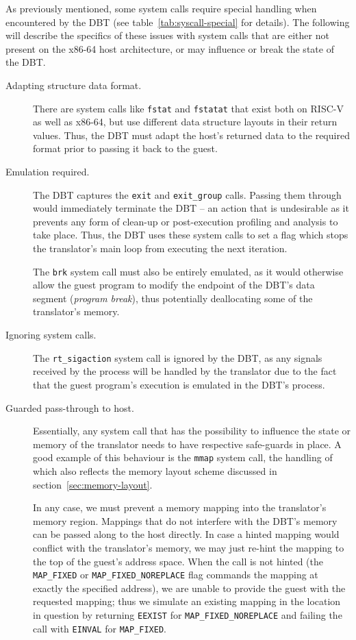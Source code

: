 As previously mentioned, some system calls require special handling when encountered by the DBT (see table~\vref{tab:syscall-special} for details).
The following will describe the specifics of these issues with system calls that are either not present on the x86-64 host architecture, or may influence or break the state of the DBT\@.
\begin{description}
	\item[Adapting structure data format.]
	There are system calls like \texttt{fstat} and \texttt{fstatat} that exist both on RISC-V as well as x86-64, but use different data structure layouts in their return values.
	Thus, the DBT must adapt the host's returned data to the required format prior to passing it back to the guest.
	
	
	\item[Emulation required.]
	The DBT captures the \texttt{exit} and \texttt{exit\_group} calls.
	Passing them through would immediately terminate the DBT -- an action that is undesirable as it prevents any form of clean-up or post-execution profiling and analysis to take place.
	Thus, the DBT uses these system calls to set a flag which stops the translator's main loop from executing the next iteration.
	
	The \texttt{brk} system call must also be entirely emulated, as it would otherwise allow the guest program to modify the endpoint of the DBT's data segment (\textit{program break}), thus potentially deallocating some of the translator's memory.
	
	
	\item[Ignoring system calls.]
	The \texttt{rt\_sigaction} system call is ignored by the DBT, as any signals received by the process will be handled by the translator due to the fact that the guest program's execution is emulated in the DBT's process.
	
	
	\item[Guarded pass-through to host.]
	Essentially, any system call that has the possibility to influence the state or memory of the translator needs to have respective safe-guards in place.
	A good example of this behaviour is the \texttt{mmap} system call, the handling of which also reflects the memory layout scheme discussed in section~\vref{sec:memory-layout}.
	
	In any case, we must prevent a memory mapping into the translator's memory region.
	Mappings that do not interfere with the DBT's memory can be passed along to the host directly.
	In case a hinted mapping would conflict with the translator's memory, we may just re-hint the mapping to the top of the guest's address space.
	When the call is not hinted (the \texttt{MAP\_FIXED} or \texttt{MAP\_FIXED\_NOREPLACE} flag commands the mapping at exactly the specified address), we are unable to provide the guest with the requested mapping;
	thus we simulate an existing mapping in the location in question by returning \texttt{EEXIST} for \texttt{MAP\_FIXED\_NOREPLACE} and failing the call with \texttt{EINVAL} for \texttt{MAP\_FIXED}.
	

\end{description}
